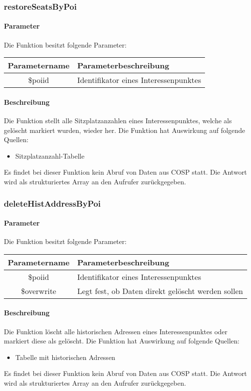 \subsubsection{restoreSeatsByPoi}
\paragraph{Parameter} Die Funktion besitzt folgende Parameter:
\begin{table}[H]
	\begin{tabular}{|c|p{11cm}|}
		\hline
		\textbf{Parametername} & \textbf{Parameterbeschreibung} \\ \hline
		\$poiid     & Identifikator eines Interessenpunktes \\ \hline
	\end{tabular}
\end{table}
\paragraph{Beschreibung} Die Funktion stellt alle Sitzplatzanzahlen eines Interessenpunktes, welche als gelöscht markiert wurden, wieder her. Die Funktion hat Auswirkung auf folgende Quellen:
\begin{itemize}
	\item Sitzplatzanzahl-Tabelle
\end{itemize}
Es findet bei dieser Funktion kein Abruf von Daten aus {\glqq COSP\grqq} statt. Die Antwort wird als strukturiertes Array an den Aufrufer zurückgegeben.
\subsubsection{deleteHistAddressByPoi}
\paragraph{Parameter} Die Funktion besitzt folgende Parameter:
\begin{table}[H]
	\begin{tabular}{|c|p{11cm}|}
		\hline
		\textbf{Parametername} & \textbf{Parameterbeschreibung} \\ \hline
		\$poiid     & Identifikator eines Interessenpunktes \\ \hline
		\$overwrite & Legt fest, ob Daten direkt gelöscht werden sollen \\ \hline
	\end{tabular}
\end{table}
\paragraph{Beschreibung} Die Funktion löscht alle historischen Adressen eines Interessenpunktes oder markiert diese als gelöscht. Die Funktion hat Auswirkung auf folgende Quellen:
\begin{itemize}
	\item Tabelle mit historischen Adressen
\end{itemize}
Es findet bei dieser Funktion kein Abruf von Daten aus {\glqq COSP\grqq} statt. Die Antwort wird als strukturiertes Array an den Aufrufer zurückgegeben.
